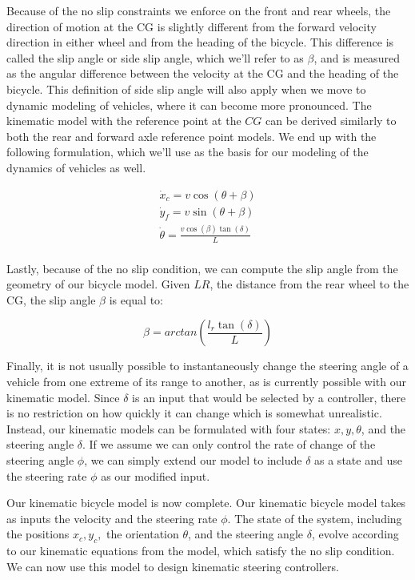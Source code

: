 Because of the no slip constraints we enforce on the front and rear wheels, the direction of motion at the CG is slightly different from the forward velocity direction in either wheel and from the heading of the bicycle. This difference is called the slip angle or side slip angle, which we'll refer to as $\beta$, and is measured as the angular difference between the velocity at the CG and the heading of the bicycle. This definition of side slip angle will also apply when we move to dynamic modeling of vehicles, where it can become more pronounced. The kinematic model with the reference point at the $CG$ can be derived similarly to both the rear and forward axle reference point models. We end up with the following formulation, which we'll use as the basis for our modeling of the dynamics of vehicles as well. 

\begin{eqnarray}
\dot{x}_c = v\cos(\theta + \beta) \\
\dot{y}_f = v\sin(\theta + \beta) \\
\dot{\theta} = \frac{v\cos(\beta)\tan(\delta)}{L} \\
\end{eqnarray}


Lastly, because of the no slip condition, we can compute the slip angle from the geometry of our bicycle model. Given $LR$, the distance from the rear wheel to the CG, the slip angle $\beta$ is equal to:

\begin{equation}
\beta = arctan(\frac{l_r \tan(\delta)}{L})
\end{equation}

Finally, it is not usually possible to instantaneously change the steering angle of a vehicle from one extreme of its range to another, as is currently possible with our kinematic model. Since $\delta$ is an input that would be selected by a controller, there is no restriction on how quickly it can change which is somewhat unrealistic. Instead, our kinematic models can be formulated with four states: $x, y, \theta$, and the steering angle $\delta$. 
If we assume we can only control the rate of change of the steering angle $\phi$, we can simply extend our model to include $\delta$ as a state and use the steering rate $\phi$ as our modified input. 

Our kinematic bicycle model is now complete.  Our kinematic bicycle model takes as inputs the velocity and the steering rate $\phi$. The state of the system, including the positions $x_c, y_c,$ the orientation $\theta$, and the steering angle $\delta$, evolve according to our kinematic equations from the model, which satisfy the no slip condition. We can now use this model to design kinematic steering controllers. 






